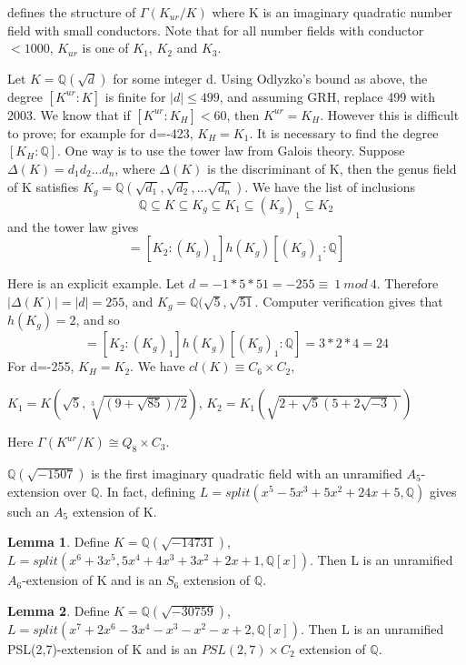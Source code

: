 \documentclass[12pt]{extarticle}
\newcommand{\murgg}{\Gamma(K^{ur}/K)}
\newcommand{\Q}{\mathbb{Q}}
\newcommand{\<}{\langle}
\renewcommand{\>}{\rangle}
\theoremstyle{definition}
\newtheorem{lemma}{Lemma}
\begin{document}
\cite{YAMA1997} defines the structure of $\Gamma(K_{ur}/K)$ where K is an imaginary quadratic number field with small conductors. Note that for all number fields with conductor $<1000$, $K_{ur}$ is one of $K_1$, $K_2$ and $K_3$. \par 
Let $K=\Q(\sqrt{d})$ for some integer d. Using Odlyzko's bound as above, the degree $[K^{ur}:K]$ is finite for $|d|\leq 499$, and assuming GRH, replace 499 with 2003. We know that if $[K^{ur}:K_H]<60$, then $K^{ur}=K_H$. However this is difficult to prove; for example for d=-423, $K_H=K_1$. It is necessary to find the degree $[K_H:\Q]$. One way is to use the tower law from Galois theory. Suppose $\Delta(K)=d_1d_2...d_n$, where $\Delta(K)$ is the discriminant of K, then the genus field of K satisfies $K_g=\Q(\sqrt{d_1},\sqrt{d_2},...\sqrt{d_n})$. We have the list of inclusions \begin{equation}
    \Q \subseteq K \subseteq K_g \subseteq K_1 \subseteq (K_g)_1 \subseteq K_2
\end{equation} and the tower law gives \begin{equation}
    [K_2:q] = [K_2:(K_g)_1]h(K_g)[(K_g)_1:\Q]
\end{equation}\par
Here is an explicit example. Let  $d=-1*5*51=-255\equiv \: 1\:mod\:4$. Therefore $|\Delta(K)|=|d|=255$, and $K_g = \Q(\sqrt{5},\sqrt{51}$. Computer verification gives that $h(K_g)=2$, and so \begin{equation}
     [K_2:\Q] = [K_2:(K_g)_1]h(K_g)[(K_g)_1:\Q]= 3*2*4=24
\end{equation}
For d=-255, $K_H=K_2$. We have $cl(K)\equiv C_6 \times C_2$, 

$K_1 = K \left( 
\sqrt{5}, \sqrt[3]{(9+\sqrt{85})/2}
\right)$, $K_2 = K_1 \left( 
\sqrt{2+\sqrt{5}(5+2\sqrt{-3})}
\right)$

 Here $\murgg \cong Q_8 \times C_3$.
\par
$\mathbb{Q}(\sqrt{-1507})$ is the first imaginary quadratic field with an unramified $A_5$-extension over $\mathbb{Q}$. In fact, defining $L=split\left( x^5-5x^3+5x^2+24x+5,\Q\right)$ gives such an $A_5$ extension of K. 
\begin{lemma}
Define $K=\mathbb{Q}(\sqrt{-14731})$, $L=split(x^6+3x^5,5x^4+4x^3+3x^2+2x+1,\mathbb{Q}[x])$. Then L is an unramified $A_6$-extension of K and is an $S_6$ extension of $\mathbb{Q}$.
\end{lemma}
\begin{lemma}
Define $K=\mathbb{Q}(\sqrt{-30759})$, $L=split(x^7+2x^6-3x^4-x^3-x^2-x+2,\mathbb{Q}[x])$. Then L is an unramified PSL(2,7)-extension of K and is an $PSL(2,7)\times C_2$ extension of $\mathbb{Q}$.
\end{lemma}
\end{document}
